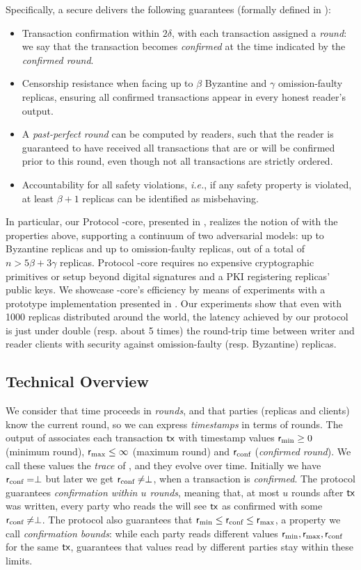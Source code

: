 Specifically, a secure \podtm delivers the following guarantees (formally defined in ):
\begin{itemize}
    \item Transaction confirmation within $2\delta$, with each transaction assigned a \emph{\confirmed round}: we say that the transaction becomes \emph{confirmed} at the time indicated by the \emph{confirmed round}.
    \item Censorship resistance when facing up to $\beta$ Byzantine and $\gamma$ omission-faulty replicas, ensuring all confirmed transactions appear in every honest reader's output.
    \item A \emph{past-perfect round} can be computed by readers, such that the reader is guaranteed to have received all transactions that are or will be confirmed prior to this round, even though not all transactions are strictly ordered.
    \item Accountability for all safety violations, \textit{i.e.}, if any safety property is violated, at least $\beta + 1$ replicas can be identified as misbehaving.
\end{itemize}

In particular, our Protocol \podtm-core, presented in , realizes the notion of \podtm with the properties above, supporting a continuum of two adversarial models: up to \beta Byzantine replicas and up to \gamma omission-faulty replicas, out of a total of $n > 5 \beta + 3 \gamma$ replicas.
Protocol \podtm-core requires no expensive cryptographic primitives or setup beyond digital signatures and a PKI registering replicas' public keys. We showcase \podtm-core's efficiency by means of experiments with a prototype implementation presented in . Our experiments show that even with 1000 replicas distributed around the world, the latency achieved by our protocol is just under double (resp. about 5 times) the round-trip time between writer and reader clients with security against omission-faulty (resp. Byzantine) replicas.


\subsection{Technical Overview}
We consider that time proceeds in \emph{rounds}, and that parties (replicas and clients) know the current round, so we can express \emph{timestamps} in terms of rounds. The output of \podtm associates each transaction $\textsf{tx}$ with timestamp values $\textsf{r}_\text{min} \geq 0$ (minimum round), $\textsf{r}_\text{max} \leq \infty$ (maximum round) and $\textsf{r}_\text{conf}$ (\emph{confirmed round}). We call these values the \emph{trace} of \tx, and they evolve over time.
Initially we have $\textsf{r}_\text{conf}=\perp$ but later we get $\textsf{r}_\text{conf} \neq \perp$, when a transaction is \emph{confirmed}. The protocol guarantees \emph{confirmation within $u$ rounds}, meaning that, at most $u$ rounds after $\textsf{tx}$ was written, every party who reads the \podtm will see $\textsf{tx}$ as confirmed with some $\textsf{r}_\text{conf} \neq \perp$.
The protocol also guarantees that $\textsf{r}_\text{min} \leq \textsf{r}_\text{conf} \leq \textsf{r}_\text{max}$, a property we call \emph{confirmation bounds}:
while each party reads different values $\textsf{r}_\text{min},\textsf{r}_\text{max},\textsf{r}_\text{conf}$ for the same $\textsf{tx}$, \podtm guarantees that values read by different parties stay within these limits.

